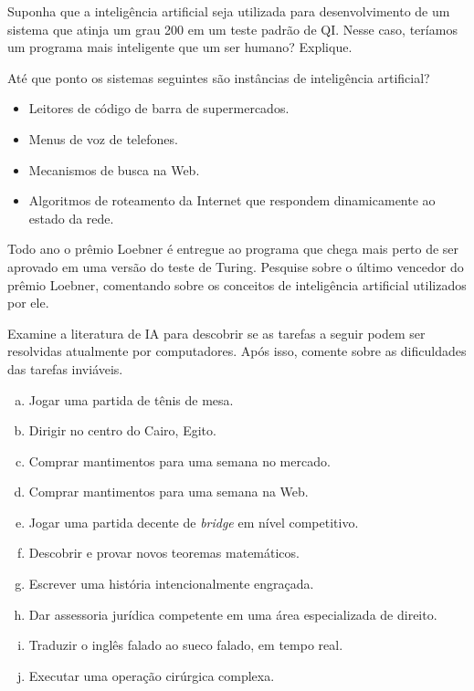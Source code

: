 \begin{exercise}
Suponha que a inteligência artificial seja utilizada para desenvolvimento de um sistema que atinja um grau 200 em um teste padrão de QI. Nesse caso, teríamos um programa mais inteligente que um ser humano? Explique.
\end{exercise}

\begin{exercise}
Até que ponto os sistemas seguintes são instâncias de inteligência artificial?
\begin{itemize}
	\item Leitores de código de barra de supermercados.
	\item Menus de voz de telefones.
	\item Mecanismos de busca na Web.
	\item Algoritmos de roteamento da Internet que respondem dinamicamente ao estado da rede.
\end{itemize}
\end{exercise}

\begin{exercise}
Todo ano o prêmio Loebner é entregue ao programa que chega mais perto de ser aprovado em uma versão do teste de Turing. Pesquise sobre o último vencedor do prêmio Loebner, comentando sobre os conceitos de inteligência artificial utilizados por ele.
\end{exercise}

\begin{exercise}
Examine a literatura de IA para descobrir se as tarefas a seguir podem ser resolvidas atualmente por computadores. Após isso, comente sobre as dificuldades das tarefas inviáveis.

\begin{enumerate}[a.]
	\item Jogar uma partida de tênis de mesa.
	\item Dirigir no centro do Cairo, Egito.
	\item Comprar mantimentos para uma semana no mercado.
	\item Comprar mantimentos para uma semana na Web.
	\item Jogar uma partida decente de \textit{bridge} em nível competitivo.
	\item Descobrir e provar novos teoremas matemáticos.
	\item Escrever uma história intencionalmente engraçada.
	\item Dar assessoria jurídica competente em uma área especializada de direito.
	\item Traduzir o inglês falado ao sueco falado, em tempo real.
	\item Executar uma operação cirúrgica complexa.
\end{enumerate}

\end{exercise}